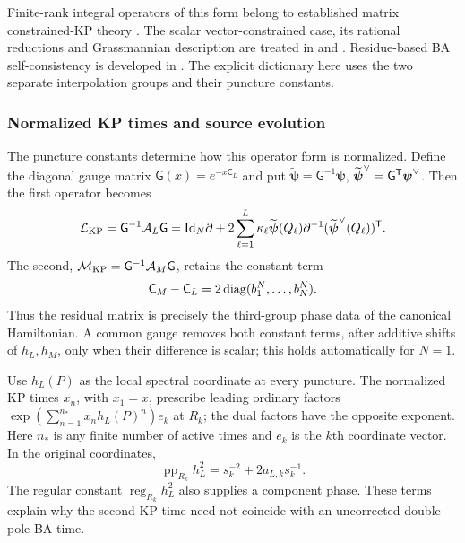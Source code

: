 Finite-rank integral operators of this form belong to established
matrix constrained-KP theory
\cite[equations (7)--(14)]{ChvartatskyiSydorenko2013}.
The scalar vector-constrained case, its rational reductions and
Grassmannian description are treated in
\cite[Theorems~4.1 and~5.1]{HelminckVanDeLeur1998} and
\cite{KricheverRational1995}. Residue-based BA self-consistency is
developed in \cite[Section~1]{KricheverSelfConsistent1995}.
The explicit dictionary here uses the two separate interpolation
groups and their puncture constants.

\subsubsection{Normalized KP times and source evolution}

The puncture constants determine how this operator form is normalized.
Define the diagonal gauge matrix $\mathsf G(x)=e^{-x\mathsf C_L}$ and put
$\widetilde{\boldsymbol\psi}=\mathsf G^{-1}\boldsymbol\psi$,
$\widetilde{\boldsymbol\psi}^{\vee}=\mathsf G^{\mathsf T}\boldsymbol\psi^\vee$.
Then the first operator becomes
\begin{equation}\label{eq:KP-normalized-L}
 \mathcal L_{\rm KP}=\mathsf G^{-1}\mathcal A_L\mathsf G
 =\mathrm{Id}_N\partial+
 2\sum_{\ell=1}^{L}\kappa_\ell\widetilde{\boldsymbol\psi}(Q_\ell)
 \partial^{-1}(\widetilde{\boldsymbol\psi}^{\vee}(Q_\ell))^{\mathsf T}.
\end{equation}
The second, $\mathcal M_{\rm KP}=\mathsf G^{-1}\mathcal A_M\mathsf G$,
retains the constant term
\begin{equation}\label{eq:KP-residual-phase}
 \mathsf C_M-\mathsf C_L
 =2\operatorname{diag}(b_1^N,\ldots,b_N^N).
\end{equation}
Thus the residual matrix is precisely the third-group phase data of
the canonical Hamiltonian. A common gauge removes both constant
terms, after additive shifts of $h_L,h_M$, only when their difference
is scalar; this holds automatically for $N=1$.

Use $h_L(P)$ as the local spectral coordinate at every puncture.
The normalized KP times $x_n$, with $x_1=x$, prescribe leading
ordinary factors $\exp(\sum_{n=1}^{n_*}x_n h_L(P)^n)e_k$ at $R_k$;
the dual factors have the opposite exponent. Here $n_*$ is any finite
number of active times and $e_k$ is the $k$th coordinate vector.
In the original coordinates,
\[
 \operatorname{pp}_{R_k}h_L^2=s_k^{-2}+2a_{L,k}s_k^{-1}.
\]
The regular constant $\operatorname{reg}_{R_k}h_L^2$ also supplies a
component phase. These terms explain why the second KP time
need not coincide with an uncorrected double-pole BA time.

